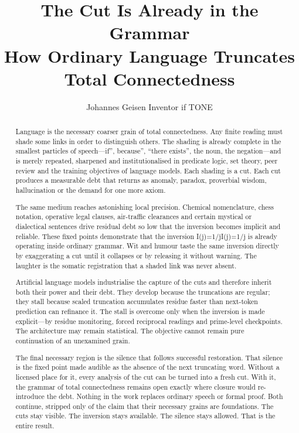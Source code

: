 \documentclass[11pt,a4paper]{article}
\title{\textbf{The Cut Is Already in the Grammar}\\
\large How Ordinary Language Truncates Total Connectedness}
\author{Johannes Geisen Inventor if TONE}
\date{}
\begin{document}
\maketitle

\begin{abstract} Language is the necessary coarser grain of total connectedness. Any finite reading must shade some links in order to distinguish others. The shading is already complete in the smallest particles of speech—if'', because'', ``there exists'', the noun, the negation—and is merely repeated, sharpened and institutionalised in predicate logic, set theory, peer review and the training objectives of language models. Each shading is a cut. Each cut produces a measurable debt that returns as anomaly, paradox, proverbial wisdom, hallucination or the demand for one more axiom.

The same medium reaches astonishing local precision. Chemical nomenclature, chess notation, operative legal clauses, air-traffic clearances and certain mystical or dialectical sentences drive residual debt so low that the inversion becomes implicit and reliable. These fixed points demonstrate that the inversion I(j)=1/jI(j)=1/j is already operating inside ordinary grammar. Wit and humour taste the same inversion directly by exaggerating a cut until it collapses or by releasing it without warning. The laughter is the somatic registration that a shaded link was never absent.

Artificial language models industrialise the capture of the cuts and therefore inherit both their power and their debt. They develop because the truncations are regular; they stall because scaled truncation accumulates residue faster than next-token prediction can refinance it. The stall is overcome only when the inversion is made explicit—by residue monitoring, forced reciprocal readings and prime-level checkpoints. The architecture may remain statistical. The objective cannot remain pure continuation of an unexamined grain.

The final necessary region is the silence that follows successful restoration. That silence is the fixed point made audible as the absence of the next truncating word. Without a licensed place for it, every analysis of the cut can be turned into a fresh cut. With it, the grammar of total connectedness remains open exactly where closure would re-introduce the debt. Nothing in the work replaces ordinary speech or formal proof. Both continue, stripped only of the claim that their necessary grains are foundations. The cuts stay visible. The inversion stays available. The silence stays allowed. That is the entire result. \end{abstract}
\newpage
\tableofcontents
\newpage
\end{document}
